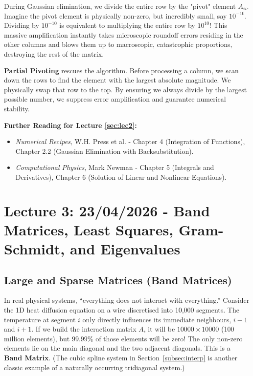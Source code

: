 \documentclass[12pt, a4paper]{article}
\begin{document}
\begin{tcolorbox}[colback=green!5!white,colframe=green!50!black,title=The Critical Necessity of Partial Pivoting]
During Gaussian elimination, we divide the entire row by the "pivot" element $A_{ii}$. 
Imagine the pivot element is physically non-zero, but incredibly small, say $10^{-10}$. 
Dividing by $10^{-10}$ is equivalent to multiplying the entire row by $10^{10}$! This massive amplification instantly takes microscopic roundoff errors residing in the other columns and blows them up to macroscopic, catastrophic proportions, destroying the rest of the matrix.

\textbf{Partial Pivoting} rescues the algorithm. Before processing a column, we scan down the rows to find the element with the largest absolute magnitude. We physically swap that row to the top. By ensuring we always divide by the largest possible number, we suppress error amplification and guarantee numerical stability.
\end{tcolorbox}

\vspace{0.5cm}
\noindent \textbf{Further Reading for Lecture \ref{sec:lec2}:}
\begin{itemize}
    \item \textit{Numerical Recipes}, W.H. Press et al. - Chapter 4 (Integration of Functions), Chapter 2.2 (Gaussian Elimination with Backsubstitution).
    \item \textit{Computational Physics}, Mark Newman - Chapter 5 (Integrals and Derivatives), Chapter 6 (Solution of Linear and Nonlinear Equations).
\end{itemize}

\newpage
\section{Lecture 3: 23/04/2026 - Band Matrices, Least Squares, Gram-Schmidt, and Eigenvalues}
\label{sec:lec3}

\subsection{Large and Sparse Matrices (Band Matrices)}
\label{subsec:bandmatrices}
In real physical systems, ``everything does not interact with everything.'' Consider the 1D heat diffusion equation on a wire discretised into 10,000 segments. The temperature at segment $i$ only directly influences its immediate neighbours, $i-1$ and $i+1$.
If we build the interaction matrix $A$, it will be $10000 \times 10000$ (100 million elements), but $99.99\%$ of those elements will be zero! The only non-zero elements lie on the main diagonal and the two adjacent diagonals. This is a \textbf{Band Matrix}. (The cubic spline system in Section~\ref{subsec:interp} is another classic example of a naturally occurring tridiagonal system.)
\end{document}
